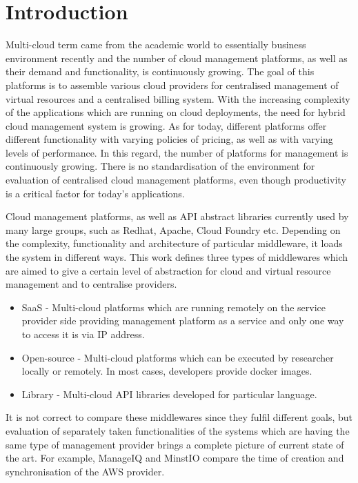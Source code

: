 \section{Introduction}
Multi-cloud term came from the academic world to essentially business environment recently and the number of cloud management platforms, as well as their demand and functionality, is continuously growing. The goal of this platforms is to assemble various cloud providers for centralised management of virtual resources and a centralised billing system. With the increasing complexity of the applications which are running on cloud deployments, the need for hybrid cloud management system is growing. As for today, different platforms offer different functionality with varying policies of pricing, as well as with varying levels of performance. In this regard, the number of platforms for management is continuously growing. There is no standardisation of the environment for evaluation of centralised cloud management platforms, even though productivity is a critical factor for today's applications.

Cloud management platforms, as well as API abstract libraries currently used by many large groups, such as Redhat\cite{redhat}, Apache\cite{Apache}, Cloud Foundry\cite{cf} etc. Depending on the complexity, functionality and architecture of particular middleware, it loads the system in different ways. This work defines three types of middlewares which are aimed to give a certain level of abstraction for cloud and virtual resource management and to centralise providers.
\begin{itemize}
\item SaaS - Multi-cloud platforms which are running remotely on the service provider side providing management platform as a service and only one way to access it is via IP address. 
\item Open-source - Multi-cloud platforms which can be executed by researcher locally or remotely. In most cases, developers provide docker images. 
\item Library - Multi-cloud API libraries developed for particular language.
\end{itemize}

It is not correct to compare these middlewares since they fulfil different goals, but evaluation of separately taken functionalities of the systems which are having the same type of management provider brings a complete picture of current state of the art. For example, ManageIQ and MinstIO compare the time of creation and synchronisation of the AWS provider.

